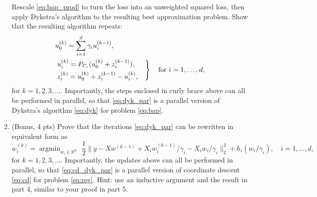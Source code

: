 \documentclass{article}
\theoremstyle{remark}
\theoremstyle{definition}
\newcommand{\argmin}{\mathop{\mathrm{argmin}}}
\def\R{\mathbb{R}}
\begin{document}
\begin{enumerate}
  Rescale \eqref{eq:bap_prod} to turn the loss into an unweighted squared loss,
  then apply Dykstra's algorithm to the resulting best approximation problem. 
  Show that the resulting algorithm repeats:  
  \begin{equation}
    \begin{aligned}
      \label{eq:dyk_par}
      &u_0^{(k)} = \sum_{i=1}^d \gamma_i u_i^{(k-1)}, \\ 
      &\begin{rcases*}
        u_i^{(k)} = P_{C_i} (u_0^{(k)} + z_i^{(k-1)}), & \\
        z_i^{(k)} = u_0^{(k)} + z_i^{(k-1)} - u_i^{(k)}, &
      \end{rcases*}
      \quad \text{for $i=1,\ldots,d$},
    \end{aligned}
  \end{equation}
  for $k=1,2,3,\ldots$.  Importantly, the steps enclosed in curly brace above
  can all be performed in parallel, so that \eqref{eq:dyk_par} is a parallel
  version of Dykstra's algorithm \eqref{eq:dyk} for problem \eqref{eq:bap}.  

\item (Bonus, 4 pts) Prove that the iterations \eqref{eq:dyk_par} can be
  rewritten in equivalent form as
  \begin{equation}
    \label{eq:cd_dyk_par}
    w_i^{(k)} = \argmin_{w_i \in \R^{p_i}} \;  
    \frac{1}{2} \Big\|y - Xw^{(k-1)} + X_i w_i^{(k-1)}/\gamma_i -  
    X_i w_i/\gamma_i\Big\|_2^2 + h_i (w_i/\gamma_i),
    \quad i=1,\ldots,d,
  \end{equation}
  for $k=1,2,3,\ldots$.  Importantly, the updates above can all be performed in
  parallel, so that \eqref{eq:cd_dyk_par} is a parallel version of coordinate
  descent \eqref{eq:cd} for problem \eqref{eq:reg}.  Hint: use an inductive
  argument and the result in part 4, similar to your proof in part 5.

\end{enumerate}
\end{document}
